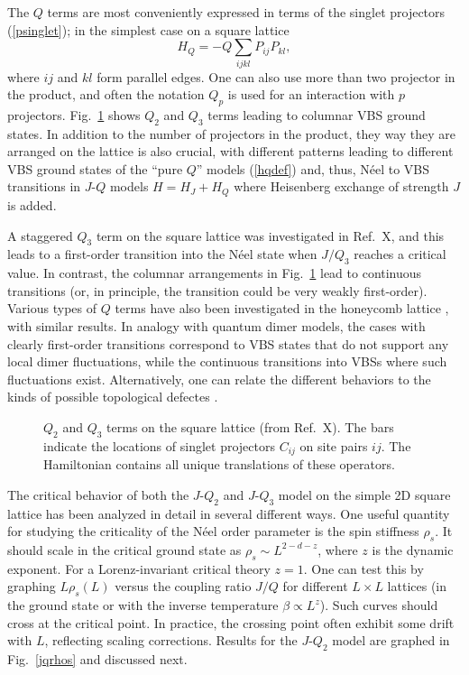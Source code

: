 \documentclass[range]{ar2e}
\begin{document}
The $Q$ terms are most conveniently expressed in terms of the singlet projectors (\ref{psinglet}); in the simplest case on a square lattice
\begin{equation}
H_Q = - Q\sum_{ijkl} P_{ij}P_{kl},
\label{hqdef}
\end{equation}
where $ij$ and $kl$ form parallel edges. One can also use more than two projector in the product, and often the notation $Q_p$ is used for an 
interaction with $p$ projectors. Fig.~\ref{qterms} shows $Q_2$ and $Q_3$ terms leading to columnar VBS ground states. In addition to the number
of projectors in the product, they way they are arranged on the lattice is also crucial, with different patterns leading to different VBS ground
states of the ``pure $Q$'' models (\ref{hqdef}) and, thus, N\'eel to VBS transitions in $J$-$Q$ models $H=H_J+H_Q$ where Heisenberg exchange of
strength $J$ is added.

A staggered $Q_3$ term on the square lattice was investigated in Ref.~X, and this leads to a first-order transition into the N\'eel state when
$J/Q_3$ reaches a critical value. In contrast, the columnar arrangements in Fig.~\ref{qterms} lead to continuous transitions (or, in principle,
the transition could be very weakly first-order). Various types of $Q$ terms have also been investigated in the honeycomb lattice \cite{Banerjee11}, 
with similar results. In analogy with quantum dimer models, the cases with clearly first-order transitions correspond to VBS states that do not
support any local dimer fluctuations, while the continuous transitions into VBSs where such fluctuations exist. Alternatively, one can relate
the different behaviors to the kinds of possible topological defectes \cite{Banerjee11}.

\begin{figure}
\centerline{}
\caption{$Q_2$ and $Q_3$ terms on the square lattice (from Ref.~X). The bars indicate the locations of singlet projectors 
$C_{ij}$ on site pairs $ij$. The Hamiltonian contains all unique translations of these operators.}
\label{qterms}
\end{figure}

The critical behavior of both the $J$-$Q_2$ and $J$-$Q_3$ model on the simple 2D square lattice has been analyzed in detail in several different ways. 
One useful quantity for studying the criticality of the N\'eel order parameter is the spin stiffness $\rho_s$. It should scale in the critical ground state 
as $\rho_s \sim L^{2-d-z}$, where $z$ is the dynamic exponent. For a Lorenz-invariant critical theory $z=1$. One can test this by graphing $L\rho_s(L)$ versus 
the coupling ratio $J/Q$ for different $L\times L$ lattices (in the ground state or with the inverse temperature $\beta \propto L^z$). Such curves should 
cross at the critical point. In practice, the crossing point often exhibit some drift with $L$, reflecting scaling corrections. Results for the $J$-$Q_2$ 
model are graphed in Fig.~\ref{jqrhos} and discussed next.
\end{document}
